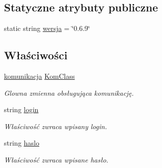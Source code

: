 \subsection*{Statyczne atrybuty publiczne}
\begin{CompactItemize}
\item 
static string \hyperlink{a00001_e61edb6568c06727bbe4d45bf5e51911}{wersja} = \char`\"{}0.6.9\char`\"{}
\end{CompactItemize}
\subsection*{Właściwości}
\begin{CompactItemize}
\item 
\hyperlink{a00013}{komunikacja} \hyperlink{a00001_77ad1d17aa36281e5e19ad1c7b4d631a}{KomClass}
\begin{CompactList}\small\item\em Glowna zmienna obsługująca komunikację. \item\end{CompactList}\item 
string \hyperlink{a00001_b2688b12edce0a3bd21274587bfe39e5}{login}
\begin{CompactList}\small\item\em Właściwość zwraca wpisany login. \item\end{CompactList}\item 
string \hyperlink{a00001_7bd096b1661801146b6ae700f5e11786}{haslo}
\begin{CompactList}\small\item\em Właściwość zwraca wpisane hasło. \item\end{CompactList}\end{CompactItemize}
